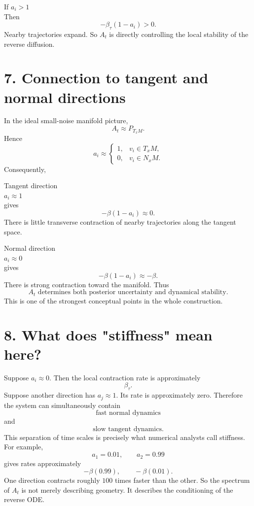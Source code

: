 \documentclass{article}
\begin{document}
If $a_i > 1$ \\
Then
\[
-\beta_\tau(1-a_i) > 0.
\]
Nearby trajectories expand.
So $A_t$ is directly controlling the local stability of the reverse diffusion.

\section*{7. Connection to tangent and normal directions}
In the ideal small-noise manifold picture,
\[
A_t \approx P_{T_xM}.
\]
Hence
\[
a_i \approx
\begin{cases}
1,& v_i\in T_xM,\\[1ex]
0,& v_i\in N_xM.
\end{cases}
\]
Consequently,

Tangent direction \\
$a_i \approx 1$ \\
gives
\[
-\beta(1-a_i) \approx 0.
\]
There is little transverse contraction of nearby trajectories along the tangent space.

Normal direction \\
$a_i \approx 0$ \\
gives
\[
-\beta(1-a_i) \approx -\beta.
\]
There is strong contraction toward the manifold.
Thus
\[
\boxed{
A_t \text{ determines both posterior uncertainty and dynamical stability.}
}
\]
This is one of the strongest conceptual points in the whole construction.

\section*{8. What does "stiffness" mean here?}
Suppose $a_i \approx 0$. Then the local contraction rate is approximately
\[
\beta_\tau.
\]
Suppose another direction has $a_j \approx 1$. Its rate is approximately zero.
Therefore the system can simultaneously contain
\[
\text{fast normal dynamics}
\]
and
\[
\text{slow tangent dynamics}.
\]
This separation of time scales is precisely what numerical analysts call stiffness.
For example,
\[
a_1 = 0.01, \qquad a_2 = 0.99
\]
gives rates approximately
\[
-\beta(0.99), \qquad -\beta(0.01).
\]
One direction contracts roughly $100$ times faster than the other.
So the spectrum of $A_t$ is not merely describing geometry. It describes the conditioning of the reverse ODE.
\end{document}
